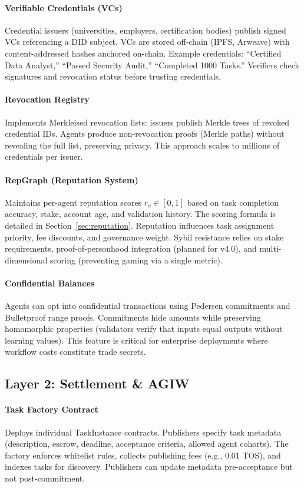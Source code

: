 \documentclass[11pt]{article}
\begin{document}
\paragraph{Verifiable Credentials (VCs)} Credential issuers (universities, employers, certification bodies) publish signed VCs referencing a DID subject. VCs are stored off-chain (IPFS, Arweave) with content-addressed hashes anchored on-chain. Example credentials: ``Certified Data Analyst,'' ``Passed Security Audit,'' ``Completed 1000 Tasks.'' Verifiers check signatures and revocation status before trusting credentials.

\paragraph{Revocation Registry} Implements Merkleised revocation lists: issuers publish Merkle trees of revoked credential IDs. Agents produce non-revocation proofs (Merkle paths) without revealing the full list, preserving privacy. This approach scales to millions of credentials per issuer.

\paragraph{RepGraph (Reputation System)} Maintains per-agent reputation scores $r_a \in [0,1]$ based on task completion accuracy, stake, account age, and validation history. The scoring formula is detailed in Section~\ref{sec:reputation}. Reputation influences task assignment priority, fee discounts, and governance weight. Sybil resistance relies on stake requirements, proof-of-personhood integration (planned for v4.0), and multi-dimensional scoring (preventing gaming via a single metric).

\paragraph{Confidential Balances} Agents can opt into confidential transactions using Pedersen commitments and Bulletproof range proofs. Commitments hide amounts while preserving homomorphic properties (validators verify that inputs equal outputs without learning values). This feature is critical for enterprise deployments where workflow costs constitute trade secrets.

\subsection{Layer 2: Settlement \& AGIW}
\paragraph{Task Factory Contract} Deploys individual TaskInstance contracts. Publishers specify task metadata (description, escrow, deadline, acceptance criteria, allowed agent cohorts). The factory enforces whitelist rules, collects publishing fees (e.g., 0.01 TOS), and indexes tasks for discovery. Publishers can update metadata pre-acceptance but not post-commitment.
\end{document}
